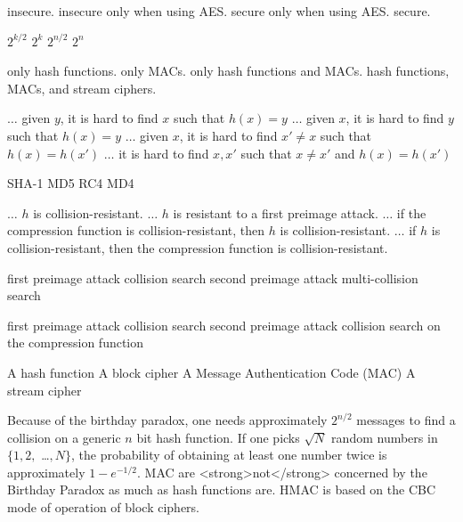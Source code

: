 %
{insecure.}%
{insecure only when using AES.}%
{secure only when using AES.}%
{secure.}%

%
{$2^{k/2}$}%
{$2^k$}%
{$2^{n/2}$}%
{$2^n$}%

%
{only hash functions.}%
{only MACs.}%
{only hash functions and MACs.}%
{hash functions, MACs, and stream ciphers.}%

{$ \dots $ given $y$, it is hard to find $x$ such that $h(x)=y$}
{$ \dots $ given $x$, it is hard to find $y$ such that $h(x)=y$}
{$ \dots $ given $x$, it is hard to find $x' \ne x$ such that $h(x)=h(x')$}
{$ \dots $ it is hard to find $x,x'$ such that $x \ne x'$ and $h(x) = h(x')$}

 {SHA-1}
 {MD5}
 {RC4} 
 {MD4}
 
 
 {$ \dots $ $h$ is collision-resistant.}
 {$ \dots $ $h$ is resistant to a first preimage attack.}
 {$ \dots $ if the compression function is collision-resistant, then $h$ is collision-resistant.}
 {$ \dots $ if $h$ is collision-resistant, then the compression function is collision-resistant.}
 
{first preimage attack}
{collision search}
{second preimage attack}
{multi-collision search}

 {first preimage attack}
 {collision search}
 {second preimage attack}
 {collision search on the compression function}

  {A hash function}
  {A block cipher}
  {A Message Authentication Code (MAC)}
  {A stream cipher}
  
  
 {Because of the birthday paradox, one needs approximately $2^{n/2}$ messages to find a collision on a generic $n$ bit hash function.}
 {If one picks $\sqrt{N}$ random numbers in $\{1,2,$ \dots $,N\}$, the probability of obtaining at least one number twice is approximately $1-e^{-1/2}$.}
 {MAC are <strong>not</strong> concerned by the Birthday Paradox as much as hash functions are.}
 {HMAC is based on the CBC mode of operation of block ciphers.}
 
